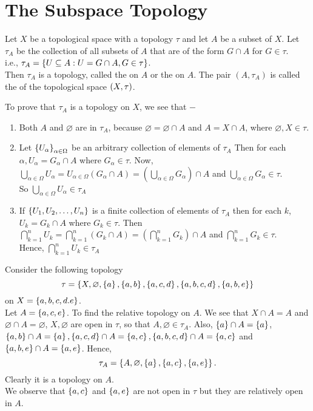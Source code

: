 \documentclass[../main-sheet.tex]{subfiles}
\begin{document}
\section{The Subspace Topology}
\begin{defn}
    Let  \(X\) be a topological space with a topology  \(\tau\)
    and let  \(A\) be a subset of  \(X\). Let  \(\tau_A\) be the collection of all subsets of  \(A\) that are of the form  \(G\cap A\) for  \(G\in\tau\).\\
    i.e.,  \(\tau_A =\left\{U\subseteq A: U=G\cap A,G\in\tau\right\}\).\\
    Then  \(\tau_A\) is a topology, called the  on  \(A\) or the  on  \(A\). The pair  \((A, \tau_A)\) is called the  of the topological space  \((X, \tau)\).
\end{defn}
To prove that  \(\tau_A\) is a topology on  \(X\), we see that  \(-\)
\begin{enumerate}[label=(\roman*)]
    \item Both  \(A\) and  \(\varnothing\) are in  \(\tau_A\), because  \(\varnothing=\varnothing\cap A\) and  \(A = X \cap A\), where  \(\varnothing, X \in \tau\).
    \item Let  \(\left\{U_\alpha\right\}_{\alpha\in \Omega}\) be an arbitrary collection of elements of  \(\tau_A\) Then for each  \(\alpha, U_\alpha = G_\alpha \cap A\) where  \(G_\alpha \in \tau\). Now,  \( \bigcup_{\alpha\in\Omega} U_\alpha=U_{\alpha\in \Omega} (G_\alpha\cap A) =\left(\bigcup_{\alpha\in \Omega} G_\alpha\right)\cap A\) and  \(\bigcup_{\alpha\in \Omega} G_\alpha \in \tau\).\\
    So  \(\bigcup_{\alpha\in \Omega} U_\alpha \in \tau_A\)
    \item If  \(\left\{U_1,U_2,\dots,U_n\right\}\) is a finite collection of elements of  \(\tau_A\) then for each  \(k\),  \(U_k= G_k\cap A\) where  \(G_k \in\tau\). Then  \(\bigcap_{k=1}^n U_k=\bigcap_{k=1}^n \left(G_k\cap A\right)=\left(\bigcap_{k=1}^n G_k\right)\cap A\) and  \(\bigcap_{k=1}^n G_k\in \tau\).\\
    Hence,  \(\bigcap_{k=1}^n U_k\in \tau_A\)
\end{enumerate}
\begin{ex}
    Consider the following topology
    \[\tau= \left\{X, \varnothing, \left\{a\right\}, \left\{a,b\right\}, \left\{a,c,d\right\}, \left\{a,b,c,d\right\}, \left\{a,b,e\right\}\right\}\]
    on  \(X = \left\{a,b,c,d.e\right\}\).\\
    Let  \(A = \left\{a,c,e\right\}\). To find the relative topology on  \(A\). We see that  \(X\cap A = A\) and  \(\varnothing \cap A=\varnothing\),  \(X,\varnothing\) are open in  \(\tau\), so that  \(A, \varnothing\in\tau_A\). Also,  \(\left\{a\right\}\cap A= \left\{a\right\}\),  \(\left\{a,b\right\}\cap A= \left\{a\right\}, \left\{a,c,d\right\}\cap A = \left\{a,c\right\}, \left\{a,b,c, d\right\} \cap A= \left\{a, c\right\}\) and  \(\left\{a, b, e\right\} \cap A = \left\{a, e\right\}\). Hence,
    \[ \tau_A =\left\{A,\varnothing, \left\{a\right\}, \left\{a,c\right\}, \left\{a,e\right\}\right\}.\]
    Clearly it is a topology on  \(A\).\\
    We observe that  \(\left\{a,c\right\}\) and  \(\left\{a,e\right\}\) are not open in  \(\tau\) but they are relatively open in  \(A\).
\end{ex}
\end{document}
